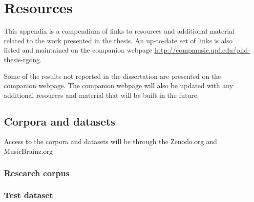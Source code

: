 \chapter{Resources}\label{app:resources}
This appendix is a compendium of links to resources and additional material related to the work presented in the thesis. An up-to-date set of links is also listed and maintained on the companion webpage \url{http://compmusic.upf.edu/phd-thesis-rgong}.

Some of the results not reported in the dissertation are presented on the companion webpage. The companion webpage will also be updated with any additional resources and material that will be built in the future. 

\section*{Corpora and datasets}
Access to the corpora and datasets will be through the Zenodo.org and MusicBrainz.org

\subsection*{Research corpus}

% 



\subsection*{Test dataset}
% 

